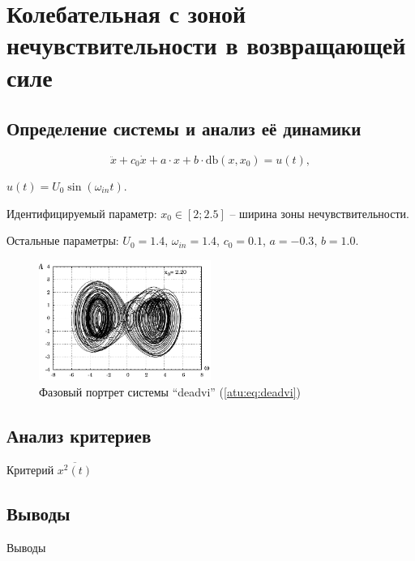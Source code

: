 
\FloatBarrier

\section{Колебательная с зоной нечувствительности в возвращающей силе} %
\label{atu:sect:deadvi}


\subsection{Определение системы и анализ её динамики} %


\begin{equation}
\ddot{x} + c_0 \dot{x} + a \cdot x + b \cdot \mathrm{db}(x,x_0) = u(t),
\label{atu:eq:deadvi}
\end{equation}

$ u(t) = U_0 \sin( \omega_{in} t ) $.

Идентифицируемый параметр:
$ x_0 \in [2;2.5] $ -- ширина зоны нечувствительности.

Остальные параметры:
$U_0 = 1.4$, $\omega_{in} = 1.4$, $c_0=0.1$, $a=-0.3$, $b=1.0$.


\begin{figure}[htb!]
\centerline{\includegraphics[width=0.5\textwidth]{p/cha/deadvi_phase.pdf} }
\caption{Фазовый портрет системы ``deadvi'' (\ref{atu:eq:deadvi})}
\label{atu:f:deadvi_phase}
\end{figure}


\subsection{Анализ критериев}  %

Критерий
$\overline{x^2(t)}$


\subsection{Выводы}  %

Выводы






